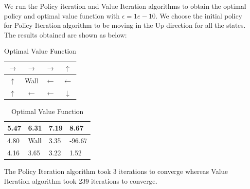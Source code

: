 \documentclass{article}
\begin{document}
\noindent %
We run the Policy iteration and Value Iteration algorithms to obtain the optimal policy and optimal value function with $\epsilon = 1e-10$.
We choose the initial policy for Policy Iteration algorithm to be moving in the Up direction for all the states. The results obtained are shown as below:

\begin{table}[H]
    \renewcommand{\arraystretch}{2}
    \begin{minipage}{.5\textwidth}
        \begin{center}
        \begin{tabular}{ | c | c| c | c | } 
            \hline
            $\rightarrow$ & $\rightarrow$ & $\rightarrow$ & \cellcolor{green!25}$\uparrow$ \\ 
            \hline
            $\uparrow$ & \cellcolor{gray!50}Wall & $\leftarrow$ & \cellcolor{red!25}$\leftarrow$ \\ 
            \hline
            $\uparrow$ & $\leftarrow$ & $\leftarrow$ & $\downarrow$ \\ 
            \hline
        \end{tabular}
        \caption{Optimal Policy}
        \end{center}
    \end{minipage}%
    \begin{minipage}{.5\textwidth}
        \begin{center}
        \begin{tabular}{ | m{1cm} | m{1cm}| m{1cm} | m{1cm} | } 
            \hline
            5.47 & 6.31 & 7.19 & \cellcolor{green!25}8.67 \\ 
            \hline
            4.80 & \cellcolor{gray!50}Wall & 3.35 & \cellcolor{red!25}-96.67 \\ 
            \hline
            4.16 & 3.65 & 3.22 & 1.52 \\ 
            \hline
        \end{tabular}
        \caption{Optimal Value Function}
    \end{center}
    \end{minipage}%
    \renewcommand{\arraystretch}{1}
\end{table}
\noindent %
The Policy Iteration algorithm took 3 iterations to converge whereas Value Iteration algorithm took 239 iterations to converge.
\end{document}
